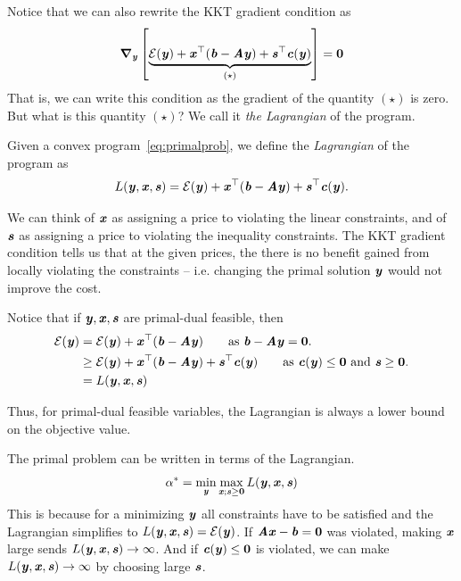 Notice that we can also rewrite the KKT gradient condition as
\[
  \grad_{\yy}
  \left[ \underbrace{\energy(\yy) + \xx^{\trp}(\bb-\AA\yy) +
      \ss^{\trp}\cc(\yy)
    }_{(\star)}
    \right]
= \veczero
  \]
That is, we can write this condition as the gradient of the quantity
$(\star)$ is zero.
But what is this quantity $(\star)$?
We call it \emph{the Lagrangian} of the program.

\begin{definition}
Given a convex program~\eqref{eq:primalprob}, we define the
\emph{Lagrangian} of the program as
\begin{equation*} L(\yy, \xx, \ss) = \energy(\yy) +
  \xx^{\trp}(\bb-\AA\yy) + \ss^{\trp}\cc(\yy). \end{equation*}


We can think of $\xx$ as assigning a price to violating the linear
constraints, and of $\ss$ as assigning a price to violating the
inequality constraints.
The KKT gradient condition tells us that at the given prices, the
there is no benefit gained from locally violating the constraints --
i.e. changing the primal solution $\yy$ would not improve the cost.

Notice that if $\yy,\xx,\ss$ are primal-dual feasible, then
\begin{align}
  \energy(\yy)
  &= \energy(\yy) + \xx^{\trp}(\bb-\AA\yy)  \tag*{as
  $\bb-\AA\yy = \veczero$.}\\
    &\geq \energy(\yy) + \xx^{\trp}(\bb-\AA\yy) + \ss^{\top} \cc(\yy)  \tag*{as
      $\cc(\yy) \leq \veczero$ and $\ss \geq \veczero$.}\\
  &= L(\yy,\xx,\ss) \label{eq:weakdual}
\end{align}

Thus, for primal-dual feasible variables, the Lagrangian is always a
lower bound on the objective value.


The primal problem can be written in terms of the Lagrangian.
\begin{equation}
  \label{eq:primalminmax}
  \alpha^* = \min_{\yy}\max_{\xx; \ss\geq\veczero} L(\yy, \xx, \ss)
\end{equation}
This is because for a minimizing $\yy$ all constraints have to be satisfied and the Lagrangian simplifies to $L(\yy,\xx,\ss) = \energy(\yy)$.
If $\AA\xx - \bb = \veczero$ was violated, making $\xx$ large sends $L(\yy,\xx,\ss) \rightarrow \infty$.
And if $\cc(\yy) \leq \veczero$ is violated, we can make $L(\yy,\xx,\ss) \rightarrow \infty$ by choosing large $\ss$.


\end{definition}
